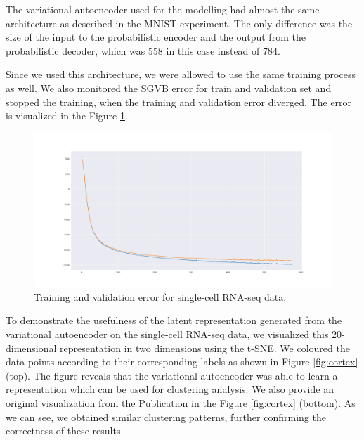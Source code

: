 The variational autoencoder used for the modelling had almost the same architecture as described in the MNIST experiment.
The only difference was the size of the input to the probabilistic encoder and the output from the probabilistic decoder, which was 558 in this case instead of 784.

Since we used this architecture, we were allowed to use the same training process as well.
We also monitored the SGVB error for train and validation set and stopped the training, when the training and validation error diverged.
The error is visualized in the Figure \ref{fig:sc_error}.

\begin{figure}
    \centering
    \includegraphics[width=\linewidth]{images/single_cell_training.png}
    \caption{Training and validation error for single-cell RNA-seq data.}
    \label{fig:sc_error}
\end{figure}

To demonstrate the usefulness of the latent representation generated from the variational autoencoder on the single-cell RNA-seq data, we visualized this 20-dimensional representation in two dimensions using the t-SNE.
We coloured the data points according to their corresponding labels as shown in Figure \ref{fig:cortex} (top).
The figure reveals that the variational autoencoder was able to learn a representation which can be used for clustering analysis.
We also provide an original visualization from the Publication \cite{lopez2018scvi} in the Figure \ref{fig:cortex} (bottom).
As we can see, we obtained similar clustering patterns, further confirming the correctness of these results.

